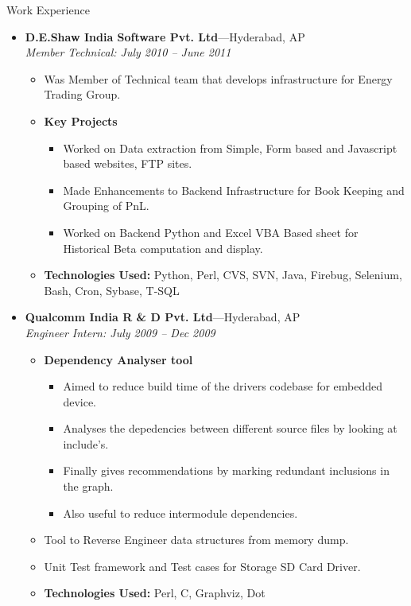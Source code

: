 \documentclass[10pt]{article}
\newenvironment{ressection}[1]{
	\vspace{4pt}
	{\fontfamily{phv}\selectfont\Large#1}
	\begin{itemize}
	\vspace{3pt}
}{
	\end{itemize}
}
\newcommand{\resitem}[1]{
	\vspace{-4pt}
	\item \begin{flushleft} #1 \end{flushleft}
}
\newcommand{\ressubitem}[1]{
	\vspace{-1pt}
	\item \begin{flushleft} #1 \end{flushleft}
}
\newcommand{\resbigitem}[3]{
	\vspace{-5pt}
	\item
	\textbf{#1}---#2 \\
	\textit{#3}
}
\newenvironment{ressubsec}[3]{
	\resbigitem{#1}{#2}{#3}
	\vspace{-2pt}
	\begin{itemize}
}{
	\end{itemize}
}
\newenvironment{reslist}[1]{
	\resitem{\textbf{#1}}
	\vspace{-5pt}
	\begin{itemize}
}{
	\end{itemize}
}
\begin{document}
\begin{ressection}{Work Experience}

	\begin{ressubsec}{D.E.Shaw India Software Pvt. Ltd}{Hyderabad, AP}{Member Technical: July 2010 -- June 2011}
		\ressubitem{Was Member of Technical team that develops infrastructure for Energy Trading Group.}
		\begin{reslist}{Key Projects}
		    \ressubitem{Worked on Data extraction from Simple, Form based and Javascript based websites, FTP sites.}
		    \ressubitem{Made Enhancements to Backend Infrastructure for Book Keeping and Grouping of PnL.}
		    \ressubitem{Worked on Backend Python and Excel VBA Based sheet for Historical Beta computation and display.}
		\end{reslist}
		\ressubitem{\textbf{Technologies Used:} Python, Perl, CVS, SVN, Java, Firebug, Selenium, Bash, Cron, Sybase, T-SQL}
	\end{ressubsec}

	\begin{ressubsec}{Qualcomm India R \& D Pvt. Ltd}{Hyderabad, AP}{Engineer Intern: July 2009 -- Dec 2009}
		\begin{reslist}{Dependency Analyser tool}
		    \ressubitem{Aimed to reduce build time of the drivers codebase for embedded device.}
		    \ressubitem{Analyses the depedencies between different source files by looking at include's.}
		    \ressubitem{Finally gives recommendations by marking redundant inclusions in the graph.}
		    \ressubitem{Also useful to reduce intermodule dependencies.}
		\end{reslist}
		    
		\ressubitem{Tool to Reverse Engineer data structures from memory dump.}
		\ressubitem{Unit Test framework and Test cases for Storage SD Card Driver.}
		
		\ressubitem{\textbf{Technologies Used:} Perl, C, Graphviz, Dot}
	\end{ressubsec}
	
\end{ressection}
\end{document}
